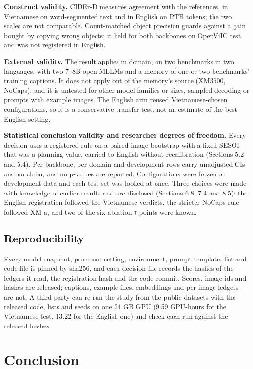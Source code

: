 \textbf{Construct validity.} CIDEr-D measures agreement with the references, in Vietnamese on
word-segmented text and in English on PTB tokens; the two scales are not comparable. Count-matched
object precision guards against a gain bought by copying wrong objects; it held for both backbones
on OpenViIC test and was not registered in English.

\textbf{External validity.} The result applies in domain, on two benchmarks in two languages, with
two 7--8B open MLLMs and a memory of one or two benchmarks' training captions. It does not apply out
of the memory's source (XM3600, NoCaps), and it is untested for other model families or sizes,
sampled decoding or prompts with example images. The English arm reused Vietnamese-chosen
configurations, so it is a conservative transfer test, not an estimate of the best English setting.

\textbf{Statistical conclusion validity and researcher degrees of freedom.} Every decision uses a
registered rule on a paired image bootstrap with a fixed SESOI that was a planning value, carried to
English without recalibration (Sections 5.2 and 5.4). Per-backbone, per-domain and development rows
carry unadjusted CIs and no claim, and no p-values are reported. Configurations were frozen on
development data and each test set was looked at once. Three choices were made with knowledge of
earlier results and are disclosed (Sections 6.8, 7.4 and 8.5): the English registration followed the
Vietnamese verdicts, the stricter NoCaps rule followed XM-a, and two of the six ablation τ points
were known.

\subsection{Reproducibility}\label{reproducibility}

Every model snapshot, processor setting, environment, prompt template, list and code file is pinned
by sha256, and each decision file records the hashes of the ledgers it read, the registration hash
and the code commit. Scores, image ids and hashes are released; captions, example files, embeddings
and per-image ledgers are not. A third party can re-run the study from the public datasets with the
released code, lists and seeds on one 24 GB GPU (9.59 GPU-hours for the Vietnamese test, 13.22 for
the English one) and check each run against the released hashes.

\section{Conclusion}\label{conclusion}

